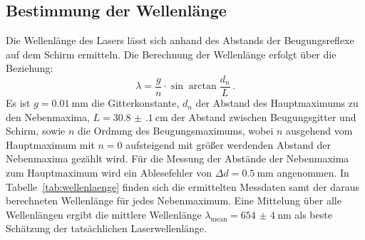 \subsection{Bestimmung der Wellenlänge}

Die Wellenlänge des Lasers lässt sich anhand des Abstands der Beugungsreflexe auf dem Schirm ermitteln.
Die Berechnung der Wellenlänge erfolgt über die Beziehung:
\begin{equation}
  \lambda=\frac{g}{n}\cdot\sin{\arctan{\frac{d_n}{L}}}\,\text{.}
\end{equation}
Es ist $g=\SI{0.01}{\milli\meter}$ die Gitterkonstante, $d_n$ der Abstand des Hauptmaximums zu den Nebenmaxima, $L=\SI{30.8(1)}{\centi\meter}$ der Abstand zwischen Beugungsgitter und Schirm, sowie $n$ die Ordnung des Beugungsmaximums, wobei $n$ ausgehend vom Hauptmaximum mit $n=0$ aufsteigend mit größer werdenden Abstand der Nebenmaxima gezählt wird.
Für die Messung der Abstände der Nebenmaxima zum Hauptmaximum wird ein Ablesefehler von $\Delta d=\SI{0.5}{\milli\meter}$ angenommen.
In Tabelle~\ref{tab:wellenlaenge} finden sich die ermittelten Messdaten samt der daraus berechneten Wellenlänge für jedes Nebenmaximum.
Eine Mittelung über alle Wellenlängen ergibt die mittlere Wellenlänge
$\lambda_{\mathrm{mean}}=\SI{654(4)}{\nano\meter}$
als beste Schätzung der tatsächlichen Laserwellenlänge.
